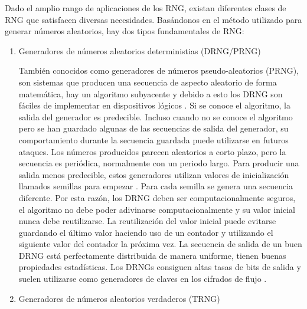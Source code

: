 	Dado el amplio rango de aplicaciones de los RNG, existan diferentes clases de RNG que satisfacen diversas necesidades. Basándonos en el método utilizado para generar números aleatorios, hay dos tipos fundamentales de RNG:
		
	\begin{enumerate}
		\item Generadores de números aleatorios deterministias (DRNG/PRNG)
		
		También conocidos como generadores de números pseudo-aleatorios (PRNG), son sistemas que producen una secuencia de aspecto aleatorio de forma matemática, hay un algoritmo subyacente y debido a esto los DRNG son fáciles de implementar en dispositivos lógicos \cite{Jun1999}. Si se conoce el algoritmo, la salida del generador es predecible. Incluso cuando no se conoce el algoritmo pero se han guardado algunas de las secuencias de salida del generador, su comportamiento durante la secuencia guardada puede utilizarse en futuros ataques. Los números producidos parecen aleatorios a corto plazo, pero la secuencia es periódica, normalmente con un periodo largo. Para producir una salida menos predecible, estos generadores utilizan valores de inicialización llamados semillas para empezar \cite{Nist2010}. Para cada semilla se genera una secuencia diferente. Por esta razón, los DRNG deben ser computacionalmente seguros, el algoritmo no debe poder adivinarse computacionalmente y su valor inicial nunca debe reutilizarse. La reutilización del valor inicial puede evitarse guardando el último valor haciendo uso de un contador y utilizando el siguiente valor del contador la próxima vez. La secuencia de salida de un buen DRNG está perfectamente distribuida de manera uniforme, tienen buenas propiedades estadísticas. Los DRNGs consiguen altas tasas de bits de salida y suelen utilizarse como generadores de claves en los cifrados de flujo \cite{Badrignans2011}.
		
		\item Generadores de números aleatorios verdaderos (TRNG)
		

\end{enumerate}
